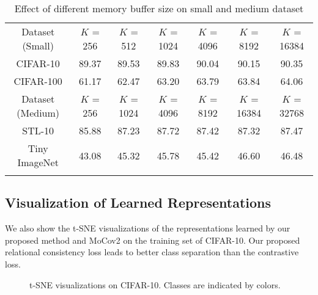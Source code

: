 \documentclass{article}
\newcommand{\<}{\left\langle}
\renewcommand{\>}{\right\rangle}
\begin{document}
\renewcommand\arraystretch{1.15}
\begin{table}[h]
\vspace{-5pt}
 \centering
 \setlength\tabcolsep{5pt}
 \small
 \caption{Effect of different memory buffer size on small and medium dataset}
 \vspace{-5pt}
 \label{table:ablation_buffer}
\begin{tabular}{c c c c c c c } 
\toprule 
Dataset (Small)     & $K$ = 256 & $K$ = 512 & $K$ = 1024 & $K$ = 4096 & $K$ = 8192 & $K$ = 16384  \\
CIFAR-10    & 89.37   & 89.53   & 89.83    & 90.04    & 90.15    & 90.35 \\ 
CIFAR-100   & 61.17   & 62.47   & 63.20    & 63.79    & 63.84    & 64.06 \\ \hline
Dataset (Medium)    & $K$ = 256 & $K$ = 1024 & $K$ = 4096 & $K$ = 8192 & $K$ = 16384 & $K$ = 32768 \\
STL-10          & 85.88   & 87.23    & 87.72 &  87.42   & 87.32     & 87.47 \\
Tiny ImageNet   & 43.08   & 45.32    & 45.78 &  45.42   & 46.60     & 46.48\\
\toprule 
\vspace{-25pt}
\end{tabular}
\end{table}



\subsection{Visualization of Learned Representations}
We also show the t-SNE \cite{tsne} visualizations of the representations learned by our proposed method and MoCov2 on the training set of CIFAR-10. Our proposed relational consistency loss leads to better class separation than the contrastive loss.

\begin{figure*}[h]
    \vspace{-10pt}
    \centering
    \caption{t-SNE visualizations on CIFAR-10. Classes are indicated by colors.}
    \vspace{-10pt}
    \label{fig:tsne}
\end{figure*}
\end{document}
